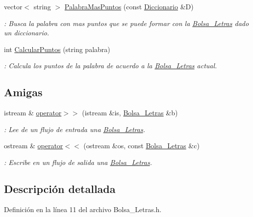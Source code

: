 \begin{DoxyCompactItemize}
vector$<$ string $>$ \hyperlink{classBolsa__Letras_a81cff895a837816fa37aa573ec9a450d}{Palabra\+Mas\+Puntos} (const \hyperlink{classDiccionario}{Diccionario} \&D)
\begin{DoxyCompactList}\small\item\em \+: Busca la palabra con mas puntos que se puede formar con la \hyperlink{classBolsa__Letras}{Bolsa\+\_\+\+Letras} dado un diccionario. \end{DoxyCompactList}\item 
int \hyperlink{classBolsa__Letras_a1c3834faeccf9a8906d5b3b120f93106}{Calcular\+Puntos} (string palabra)
\begin{DoxyCompactList}\small\item\em \+: Calcula los puntos de la palabra de acuerdo a la \hyperlink{classBolsa__Letras}{Bolsa\+\_\+\+Letras} actual. \end{DoxyCompactList}\end{DoxyCompactItemize}
\subsection*{Amigas}
\begin{DoxyCompactItemize}
\item 
istream \& \hyperlink{classBolsa__Letras_a411e49a5cfaff550ca5f6977ff18efba}{operator$>$$>$} (istream \&is, \hyperlink{classBolsa__Letras}{Bolsa\+\_\+\+Letras} \&b)
\begin{DoxyCompactList}\small\item\em \+: Lee de un flujo de entrada una \hyperlink{classBolsa__Letras}{Bolsa\+\_\+\+Letras}. \end{DoxyCompactList}\item 
ostream \& \hyperlink{classBolsa__Letras_a4467ebafe1a0f889e3fda938465ed12c}{operator$<$$<$} (ostream \&os, const \hyperlink{classBolsa__Letras}{Bolsa\+\_\+\+Letras} \&c)
\begin{DoxyCompactList}\small\item\em \+: Escribe en un flujo de salida una \hyperlink{classBolsa__Letras}{Bolsa\+\_\+\+Letras}. \end{DoxyCompactList}\end{DoxyCompactItemize}


\subsection{Descripción detallada}


Definición en la línea 11 del archivo Bolsa\+\_\+\+Letras.\+h.



